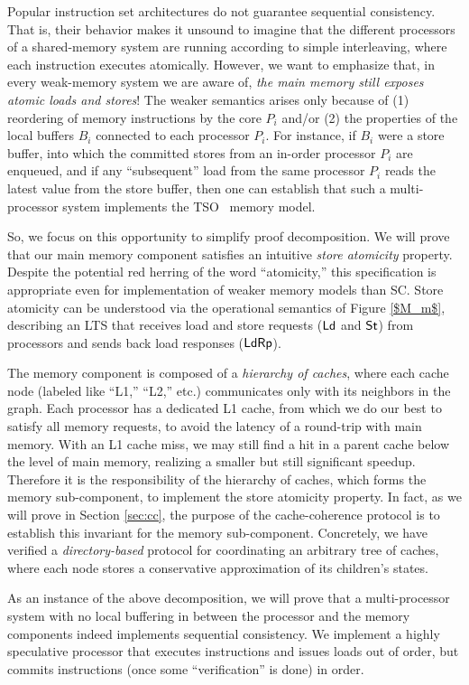 Popular instruction set architectures do not guarantee sequential
consistency.  That is, their behavior makes it unsound to imagine that
the different processors of a shared-memory system are running
according to simple interleaving, where each instruction executes
atomically.  However, we want to emphasize that, in every weak-memory
system we are aware of, \emph{the main memory still exposes atomic
  loads and stores}!  The weaker semantics arises only because of (1)
reordering of memory instructions by the core $P_i$ and/or (2) the
properties of the local buffers $B_i$ connected to each processor
$P_i$.  For instance, if $B_i$ were a store buffer, into which the
committed stores from an in-order processor $P_i$ are enqueued, and if
any ``subsequent'' load from the same processor $P_i$ reads the latest
value from the store buffer, then one can establish that such a
multi-processor system implements the TSO~\cite{x86tsocacm10} memory
model.

So, we focus on this opportunity to simplify proof decomposition.  We
will prove that our main memory component satisfies an intuitive
\emph{store atomicity} property.  Despite the potential red herring of
the word ``atomicity,'' this specification is appropriate even for
implementation of weaker memory models than SC.  Store atomicity can
be understood via the operational semantics of Figure \ref{$M_m$},
describing an LTS that receives load and store requests ($\mathsf{Ld}$ and
$\mathsf{St}$) from processors and sends back load responses ($\mathsf{Ld}\mathsf{Rp}$).

The memory component is composed of a \emph{hierarchy of caches}, where each
cache node (labeled like ``L1,'' ``L2,'' etc.) communicates only with its
neighbors in the graph.  Each processor has a dedicated L1 cache, from which we
do our best to satisfy all memory requests, to avoid the latency of a
round-trip with main memory.  With an L1 cache miss, we may still find a hit in
a parent cache below the level of main memory, realizing a smaller but still
significant speedup.  Therefore it is the responsibility of the hierarchy of
caches, which forms the memory sub-component, to implement the store atomicity
property. In fact, as we will prove in Section \ref{sec:cc}, the purpose of the
cache-coherence protocol is to establish this invariant for the memory
sub-component.  Concretely, we have verified a \emph{directory-based} protocol
for coordinating an arbitrary tree of caches, where each node stores a
conservative approximation of its children's states.

As an instance of the above decomposition, we will prove that a multi-processor
system with no local buffering in between the processor and the memory
components indeed implements sequential consistency. We implement a highly
speculative processor that executes instructions and issues loads out of
order, but commits instructions (once some ``verification'' is done) in order.

